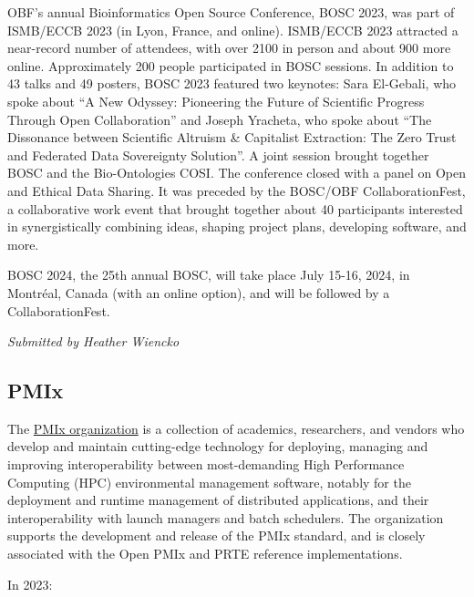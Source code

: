 \documentclass[a4paper]{report}
\begin{document}
OBF's annual Bioinformatics Open Source Conference, BOSC 2023, was part of ISMB/ECCB 2023 (in Lyon, France, and online). ISMB/ECCB 2023 attracted a near-record number of attendees, with over 2100 in person and about 900 more online. Approximately 200 people participated in BOSC sessions. In addition to 43 talks and 49 posters, BOSC 2023 featured two keynotes: Sara El-Gebali, who spoke about ``A New Odyssey: Pioneering the Future of Scientific Progress Through Open Collaboration'' and Joseph Yracheta, who spoke about ``The Dissonance between Scientific Altruism \& Capitalist Extraction: The Zero Trust and Federated Data Sovereignty Solution''. A joint session brought together BOSC and the Bio-Ontologies COSI. The conference closed with a panel on Open and Ethical Data Sharing. It was preceded by the BOSC/OBF CollaborationFest, a collaborative work event that brought together about 40 participants interested in synergistically combining ideas, shaping project plans, developing software, and more.

BOSC 2024, the 25th annual BOSC, will take place July 15-16, 2024, in Montréal, Canada (with an online option), and will be followed by a CollaborationFest.

{\em Submitted by Heather Wiencko}

\subsection{PMIx}

The \href{https://pmix.github.io/}{PMIx organization} is a collection of academics, researchers, and vendors who develop and maintain cutting-edge technology for deploying, managing and improving interoperability between most-demanding High Performance Computing (HPC) environmental management software, notably for the deployment and runtime management of distributed applications, and their interoperability with launch managers and batch schedulers. The organization supports the development and release of the PMIx standard, and is closely associated with the Open PMIx and PRTE reference implementations.

In 2023:
\end{document}
